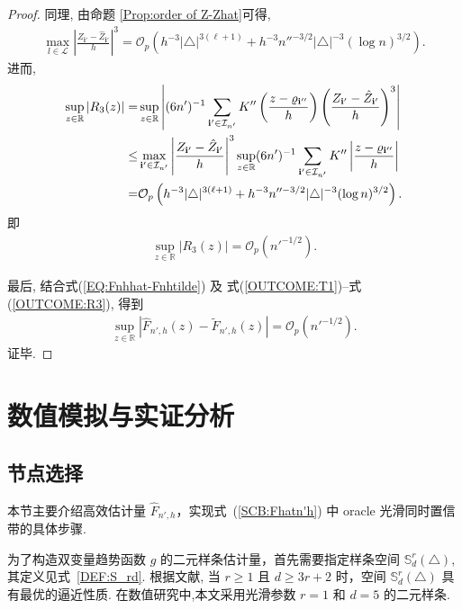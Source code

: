 \documentclass[a4paper,openay,14pt]{ctexbook}
\numberwithin{equation}{section}
\numberwithin{lem}{section}
\newcommand{\chapterwithfancyheader}[1]{  
    \chapter{#1} %
    \thispagestyle{fancy} %
}
\begin{document}
\begin{proof}
同理, 由命题 \ref{Prop:order of Z-Zhat}可得,
\begin{align*}
            \max_{l\in\mathcal{L}}\left\vert\frac{Z_{\mathbf{i}'}-\hat{Z}_{\mathbf{i}'}}{h}\right\vert^3 = \mathcal{O}_p\left(h^{-3}\vert\triangle\vert^{3(\ell+1)}+h^{-3}n''^{-3/2}\vert\triangle\vert^{-3}(\log n)^{3/2}\right).
        \end{align*}
进而,
\begin{align*}
            \sup_{z\in\mathbb{R}}\left\vert R_3(z)\right\vert = & \sup_{z\in\mathbb{R}}\left\vert (6n')^{-1}\sum_{\mathbf{i}'\in\mathcal{I}_{n'}}K''\left(\frac{z-\varrho_{\mathbf{i}''}}{h}\right)\left(\frac{Z_{\mathbf{i}'}-\hat{Z}_{\mathbf{i}'}}{h}\right)^3\right\vert\notag\\
            \leq& \max_{\mathbf{i}'\in\mathcal{I}_{n'}}\left\vert\frac{Z_{\mathbf{i}'}-\hat{Z}_{\mathbf{i}'}}{h}\right\vert^3\sup_{z\in\mathbb{R}}(6n')^{-1}\sum_{\mathbf{i}'\in\mathcal{I}_{n'}}K''\left\vert\frac{z-\varrho_{\mathbf{i}''}}{h}\right\vert\notag\\
            =& \mathcal{O}_p\left(h^{-3}\vert\triangle\vert^{3(\ell+1)}+h^{-3}n''^{-3/2}\vert\triangle\vert^{-3}(\log n)^{3/2}\right).\notag
        \end{align*}
        即
    \begin{align}\label{OUTCOME:R3}
                \sup_{z\in\mathbb{R}}\left\vert R_3(z)\right\vert = {\scriptstyle\mathcal{O}}_p(n'^{-1/2}).
            \end{align}

最后, 结合式(\ref{EQ:Fnhhat-Fnhtilde}) 及
式(\ref{OUTCOME:T1})–式(\ref{OUTCOME:R3}), 得到
\begin{align*}
    \sup_{z\in\mathbb{R}}
    \left|\hat{F}_{n',h}(z)-\tilde{F}_{n',h}(z)\right|
    ={\scriptstyle\mathcal{O}}_p\left(n'^{-1/2}\right).
\end{align*}
证毕.

\end{proof}


\chapterwithfancyheader{数值模拟与实证分析}\label{SEC: application}

\section{节点选择}
本节主要介绍高效估计量 $\hat{F}_{n',h}$，实现式~(\ref{SCB:Fhatn'h}) 中 oracle 光滑同时置信带的具体步骤.

为了构造双变量趋势函数 $g$ 的二元样条估计量，首先需要指定样条空间 $\mathbb{S}_{d}^{r}(\triangle)$, 其定义见式~\eqref{DEF:S_rd}. 根据文献\cite{lai2007spline}, 当 $r \geq 1$ 且 $d \geq 3r + 2$ 时，空间 $\mathbb{S}_{d}^{r}(\triangle)$ 具有最优的逼近性质. 在数值研究中,本文采用光滑参数 $r = 1$ 和 $d = 5$ 的二元样条.
\end{document}
